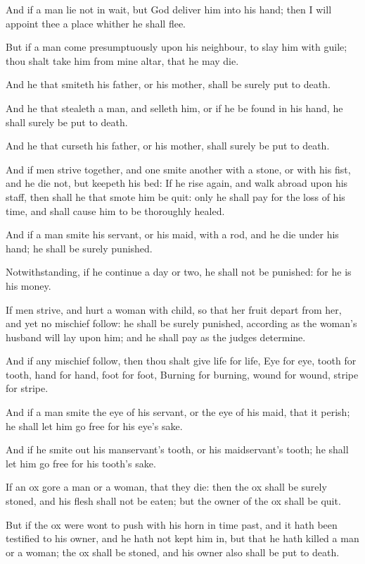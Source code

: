 \Verse And if a man lie not in wait, but God deliver him into his hand; then I will appoint thee a place whither he shall flee.

\Verse But if a man come presumptuously upon his neighbour, to slay him with guile; thou shalt take him from mine altar, that he may die.

\Verse And he that smiteth his father, or his mother, shall be surely put to death.

\Verse And he that stealeth a man, and selleth him, or if he be found in his hand, he shall surely be put to death.

\Verse And he that curseth his father, or his mother, shall surely be put to death.

\Verse And if men strive together, and one smite another with a stone, or with his fist, and he die not, but keepeth his bed: \Verse If he rise again, and walk abroad upon his staff, then shall he that smote him be quit: only he shall pay for the loss of his time, and shall cause him to be thoroughly healed.

\Verse And if a man smite his servant, or his maid, with a rod, and he die under his hand; he shall be surely punished.

\Verse Notwithstanding, if he continue a day or two, he shall not be punished: for he is his money.

\Verse If men strive, and hurt a woman with child, so that her fruit depart from her, and yet no mischief follow: he shall be surely punished, according as the woman's husband will lay upon him; and he shall pay as the judges determine.

\Verse And if any mischief follow, then thou shalt give life for life, \Verse Eye for eye, tooth for tooth, hand for hand, foot for foot, \Verse Burning for burning, wound for wound, stripe for stripe.

\Verse And if a man smite the eye of his servant, or the eye of his maid, that it perish; he shall let him go free for his eye's sake.

\Verse And if he smite out his manservant's tooth, or his maidservant's tooth; he shall let him go free for his tooth's sake.

\Verse If an ox gore a man or a woman, that they die: then the ox shall be surely stoned, and his flesh shall not be eaten; but the owner of the ox shall be quit.

\Verse But if the ox were wont to push with his horn in time past, and it hath been testified to his owner, and he hath not kept him in, but that he hath killed a man or a woman; the ox shall be stoned, and his owner also shall be put to death.

